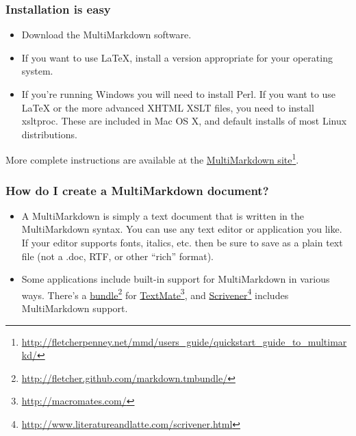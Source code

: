 \begin{frame}

\frametitle{Installation is easy}
\label{installationiseasy}

\begin{itemize}
\item Download the MultiMarkdown software.

\item If you want to use LaTeX, install a version appropriate for your operating
 system.

\item If you're running Windows you will need to install Perl. If you want to use
 LaTeX or the more advanced XHTML XSLT files, you need to install xsltproc.
 These are included in Mac OS X, and default installs of most Linux
 distributions.

\end{itemize}

More complete instructions are available at the \href{http://fletcherpenney.net/mmd/users_guide/quickstart_guide_to_multimarkd/}{MultiMarkdown site}\footnote{\href{http://fletcherpenney.net/mmd/users_guide/quickstart_guide_to_multimarkd/}{http:\slash \slash fletcherpenney.net\slash mmd\slash users\_guide\slash quickstart\_guide\_to\_multimarkd\slash }}.

\end{frame}

\begin{frame}

\frametitle{How do I create a MultiMarkdown document?}
\label{howdoicreateamultimarkdowndocument}

\begin{itemize}
\item A MultiMarkdown is simply a text document that is written in the
 MultiMarkdown syntax. You can use any text editor or application you like.
 If your editor supports fonts, italics, etc. then be sure to save as a plain
 text file (not a .doc, RTF, or other ``rich'' format).

\item Some applications include built-in support for MultiMarkdown in various
 ways. There's a \href{http://fletcher.github.com/markdown.tmbundle/}{bundle}\footnote{\href{http://fletcher.github.com/markdown.tmbundle/}{http:\slash \slash fletcher.github.com\slash markdown.tmbundle\slash }} for \href{http://macromates.com/}{TextMate}\footnote{\href{http://macromates.com/}{http:\slash \slash macromates.com\slash }}, and \href{http://www.literatureandlatte.com/scrivener.html}{Scrivener}\footnote{\href{http://www.literatureandlatte.com/scrivener.html}{http:\slash \slash www.literatureandlatte.com\slash scrivener.html}} includes
 MultiMarkdown support.

\end{itemize}

\end{frame}

